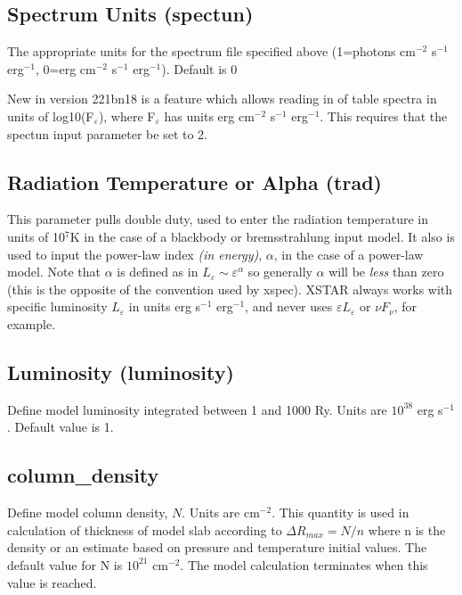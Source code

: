 \subsection{Spectrum Units (spectun)}

The appropriate units for the spectrum file specified above 
(1=photons cm$^{-2}$ s$^{-1}$ erg$^{-1}$, 0=erg cm$^{-2}$ s$^{-1}$ erg$^{-1}$).
Default is 0

New in version 221bn18 is a feature which 
allows reading in of table spectra in units 
of log10(F$_\varepsilon$), where F$_\varepsilon$ has units 
erg cm$^{-2}$ s$^{-1}$ erg$^{-1}$.  This requires that the spectun
input parameter be set to 2.


\subsection{Radiation Temperature or Alpha (trad)}

This parameter pulls double duty, used to enter the radiation 
temperature in units of 10$^7$K in the case of a blackbody or 
bremsstrahlung input model.   It also is used to input  
the power-law index {\it (in energy)}, $\alpha$, in the case of a power-law model.  Note 
that $\alpha$ is defined as in $L_\varepsilon\sim\varepsilon^{\alpha}$ 
so generally $\alpha$ will be {\it less} than zero (this is the opposite of the convention
used by xspec).  XSTAR always works with 
specific luminosity $L_\varepsilon$ in units erg s$^{-1}$ erg$^{-1}$, 
and never uses $\varepsilon L_\varepsilon$ or $\nu F_\nu$, for example.

\subsection{Luminosity (luminosity)}  

Define model luminosity integrated between 1 and 1000 Ry.  
Units are $10^{38}$ erg s$^{-1}$.  Default value is 1.

\subsection{column\_density}   

Define model column density, $N$.  Units are cm$^{-2}$.  This quantity is used 
in calculation of thickness of model slab according to 
$\Delta R_{max}=N/n$ where n is the density or an estimate based on pressure 
and temperature initial values.  The default value for N is $10^{21}$ 
cm$^{-2}$. The model calculation terminates when this value is reached.

